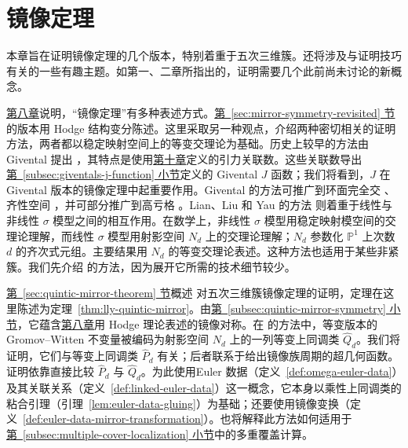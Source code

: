 \chapter{镜像定理}\label{chap:mirror-theorem}
本章旨在证明镜像定理的几个版本，特别着重于五次三维簇。还将涉及与证明技巧有关的一些有趣主题。如第一、二章所指出的，证明需要几个此前尚未讨论的新概念。

\hyperref[chap:quantum-cohomology]{第八章}说明，“镜像定理”有多种表述方式。\hyperref[sec:mirror-symmetry-revisited]{第~\ref*{sec:mirror-symmetry-revisited} 节}的版本用 Hodge 结构变分陈述。这里采取另一种观点，介绍两种密切相关的证明方法，两者都以稳定映射空间上的等变交理论为基础。历史上较早的方法由 Givental 提出 ，其特点是使用\hyperref[chap:quantum-differential-equations]{第十章}定义的引力关联数。这些关联数导出\hyperref[subsec:giventals-j-function]{第~\ref*{subsec:giventals-j-function} 小节}定义的 Givental $J$ 函数；我们将看到，$J$ 在 Givental 版本的镜像定理中起重要作用。Givental 的方法可推广到环面完全交 、齐性空间 ，并可部分推广到高亏格 。Lian、Liu 和 Yau 的方法  则着重于线性与非线性 $\sigma$ 模型之间的相互作用。在数学上，非线性 $\sigma$ 模型用稳定映射模空间的交理论理解，而线性 $\sigma$ 模型用射影空间 $N_d$ 上的交理论理解；$N_d$ 参数化 $\mathbb P^1$ 上次数 $d$ 的齐次式元组。主要结果用 $N_d$ 的等变交理论表述。这种方法也适用于某些非紧簇。我们先介绍  的方法，因为展开它所需的技术细节较少。

\hyperref[sec:quintic-mirror-theorem]{第~\ref*{sec:quintic-mirror-theorem} 节}概述  对五次三维簇镜像定理的证明，定理在这里陈述为定理~\ref{thm:lly-quintic-mirror}。由\hyperref[subsec:quintic-mirror-symmetry]{第~\ref*{subsec:quintic-mirror-symmetry} 小节}，它蕴含\hyperref[chap:quantum-cohomology]{第八章}用 Hodge 理论表述的镜像对称。在  的方法中，等变版本的 Gromov--Witten 不变量被编码为射影空间 $N_d$ 上的一列等变上同调类 $\widehat Q_d$。我们将证明，它们与等变上同调类 $\widehat P_d$ 有关；后者联系于给出镜像族周期的超几何函数。证明依靠直接比较 $\widehat P_d$ 与 $\widehat Q_d$。为此使用Euler 数据（定义~\ref{def:omega-euler-data}）及其关联关系（定义~\ref{def:linked-euler-data}）这一概念，它本身以乘性上同调类的粘合引理（引理~\ref{lem:euler-data-gluing}）为基础；还要使用镜像变换（定义~\ref{def:euler-data-mirror-transformation}）。也将解释此方法如何适用于\hyperref[subsec:multiple-cover-localization]{第~\ref*{subsec:multiple-cover-localization} 小节}中的多重覆盖计算。

